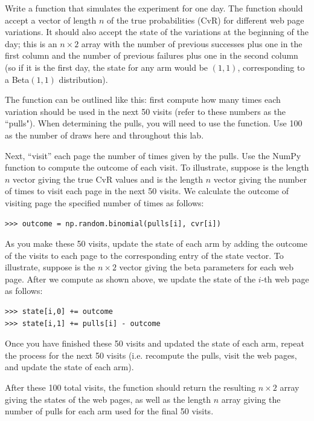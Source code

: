 \begin{problem}
Write a function  that simulates the experiment for one day.
The function should accept a vector of length $n$ of the true probabilities (CvR)
for different web page variations.  It should also accept the state of the variations
at the beginning of the day; this is an $n \times 2$ array with the number of previous
successes plus one in the first column and the number of previous failures plus one in
the second column (so if it is the first day, the state for any arm would be $(1,1)$,
corresponding to a Beta$(1,1)$ distribution).

The function can be outlined like this: first compute how many times each variation
should be used in the next 50 visits (refer to these numbers as the ``pulls").
When determining the pulls, you will need to use
the  function.  Use 100 as the number of draws here and throughout this lab.

Next, ``visit'' each page the number of times given by the pulls.
Use the NumPy function  to compute the outcome of each visit.
To illustrate, suppose  is the length $n$ vector giving the true CvR values
and  is the length $n$ vector giving the number of times to visit each page
in the next 50 visits. We calculate the outcome of visiting page  the
specified number of times as follows:
\begin{lstlisting}
>>> outcome = np.random.binomial(pulls[i], cvr[i])
\end{lstlisting}

As you make these 50 visits, update the state of each arm by adding the outcome of the visits
to each page to the corresponding entry of the state vector.
To illustrate, suppose  is the $n \times 2$ vector giving the beta parameters
for each web page. After we compute  as shown above, we update the
state of the $i$-th web page as follows:
\begin{lstlisting}
>>> state[i,0] += outcome
>>> state[i,1] += pulls[i] - outcome
\end{lstlisting}

Once you have finished these 50 visits and updated the state of each arm,
repeat the process for the next 50 visits (i.e. recompute the pulls,
visit the web pages, and update the state of each arm).

After these 100 total visits,
the function should return the resulting $n\times 2$ array giving the states of the web pages,
as well as the length $n$ array giving the number of pulls for each arm used for the final
50 visits.
\end{problem}

